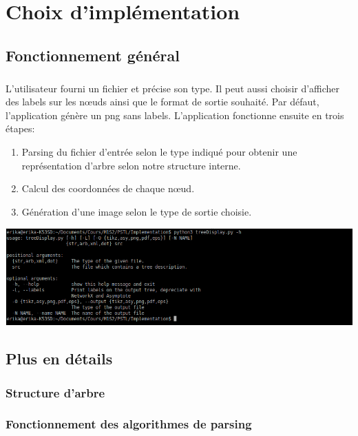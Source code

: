 \chapter{Choix d'implémentation}

\section{Fonctionnement général}

\paragraph{}L'utilisateur fourni un fichier et précise son type. Il peut aussi choisir d'afficher des labels sur les n\oe uds ainsi que le format de sortie souhaité. Par défaut, l'application génère un png sans labels. L'application fonctionne ensuite en trois étapes:
\begin{enumerate}
	\item Parsing du fichier d'entrée selon le type indiqué pour obtenir une représentation d'arbre selon notre structure interne.
	\item Calcul des coordonnées de chaque n\oe ud.
	\item Génération d'une image selon le type de sortie choisie.
\end{enumerate}

\begin{center}
\includegraphics[width=\columnwidth]{usage}
\end{center}

\section{Plus en détails}

	\subsection{Structure d'arbre}
	


	\subsection{Fonctionnement des algorithmes de parsing}

